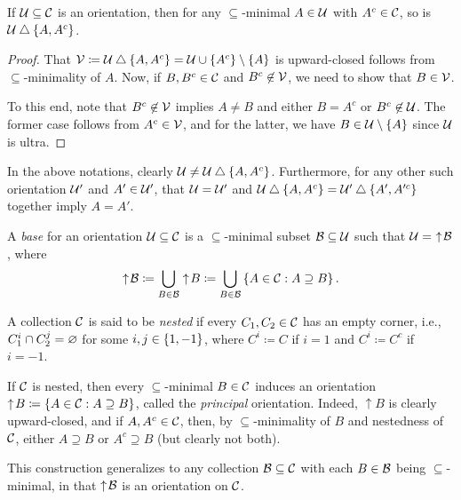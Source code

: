 \documentclass{amsart}
\begin{document}
    \begin{lemma}\label{tree-well-define}
        If $\mc{U}\subseteq\mc{C}$ is an orientation, then for any $\subseteq$-minimal $A\in\mc{U}$ with $A^c\in\mc{C}$, so is $\mc{U}\symdiff\l\{A,A^c\r\}$.
    \end{lemma}
    \begin{proof}
        That $\mc{V}\coloneqq\mc{U}\symdiff\l\{A,A^c\r\}=\mc{U}\cup\l\{A^c\r\}\comp\l\{A\r\}$ is upward-closed follows from $\subseteq$-minimality of $A$. Now, if $B,B^c\in\mc{C}$ and $B^c\not\in\mc{V}$, we need to show that $B\in\mc{V}$.

        To this end, note that $B^c\not\in\mc{V}$ implies $A\neq B$ and either $B=A^c$ or $B^c\not\in\mc{U}$. The former case follows from $A^c\in\mc{V}$, and for the latter, we have $B\in\mc{U}\comp\l\{A\r\}$ since $\mc{U}$ is ultra.
    \end{proof}

    \begin{remark}\label{tree-no-loops}
        In the above notations, clearly $\mc{U}\neq\mc{U}\symdiff\l\{A,A^c\r\}$. Furthermore, for any other such orientation $\mc{U}'$ and $A'\in\mc{U}'$, that $\mc{U}=\mc{U}'$ and $\mc{U}\symdiff\l\{A,A^c\r\}=\mc{U}'\symdiff\l\{A',A'^c\r\}$ together imply $A=A'$.
    \end{remark}

    \begin{definition}
        A \textit{base} for an orientation $\mc{U}\subseteq\mc{C}$ is a $\subseteq$-minimal subset $\mc{B}\subseteq\mc{U}$ such that $\mc{U}=\,\,\uparrow\!\mc{B}$, where
        \begin{equation*}
            \uparrow\!\mc{B}\coloneqq\bigcup_{B\in\mc{B}}\uparrow\!B\coloneqq\bigcup_{B\in\mc{B}}\l\{A\in\mc{C}\st A\supseteq B\r\}.
        \end{equation*}
    \end{definition}

    \begin{definition}
        A collection $\mc{C}$ is said to be \textit{nested} if every $C_1,C_2\in\mc{C}$ has an empty corner, i.e., $C_1^i\cap C_2^j=\em$ for some $i,j\in\l\{1,-1\r\}$, where $C^i\coloneqq C$ if $i=1$ and $C^i\coloneqq C^c$ if $i=-1$.
    \end{definition}

    \begin{remark}
        If $\mc{C}$ is nested, then every $\subseteq$-minimal $B\in\mc{C}$ induces an orientation $\uparrow\!B\coloneqq\l\{A\in\mc{C}\st A\supseteq B\r\}$, called the \textit{principal} orientation. Indeed, $\uparrow\!B$ is clearly upward-closed, and if $A,A^c\in\mc{C}$, then, by $\subseteq$-minimality of $B$ and nestedness of $\mc{C}$, either $A\supseteq B$ or $A^c\supseteq B$ (but clearly not both).

        This construction generalizes to any collection $\mc{B}\subseteq\mc{C}$ with each $B\in\mc{B}$ being $\subseteq$-minimal, in that $\uparrow\!\mc{B}$ is an orientation on $\mc{C}$.
    \end{remark}
\end{document}
